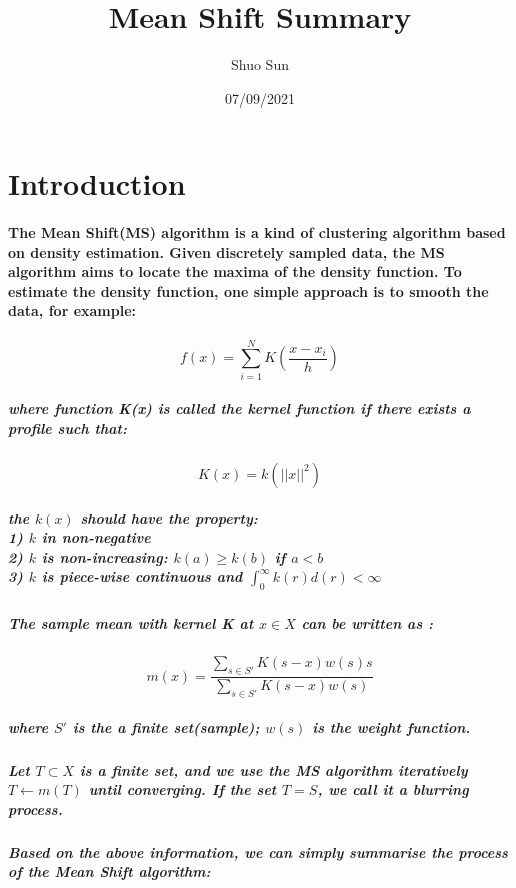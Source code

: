 \documentclass{article}
\title{Mean Shift Summary}
\author{Shuo Sun}
\date{07/09/2021}
\begin{document}
\maketitle

\section{Introduction}
\paragraph{
The Mean Shift(MS) algorithm is a kind of clustering algorithm based on density estimation. Given discretely sampled data, the MS algorithm aims to locate the maxima of the density function. To estimate the density function, one simple approach is to smooth the data, for example:
}
\begin{equation}
f(x) = \sum_{i=1}^{N}K(\frac{x-x_{i}}{h})
\end{equation}

\subparagraph{
where function K(x) is called the \textit{kernel function} if there exists a profile such that:
}
\begin{equation}
K(x) = k(||x||^2)
\end{equation}

\subparagraph{
the $k(x)$ should have the property:\\
1) $k$ in non-negative\\
2) $k$ is non-increasing: $k(a) \geq k(b)$ if $a < b$\\
3) $k$ is piece-wise continuous and $\int_{0}^{\infty}k(r)d(r) < \infty $
}

\subparagraph{
The sample mean with kernel K at $x \in X$ can be written as :
}

\begin{equation}
m(x) = \frac{\sum_{s\in S'}K(s-x)w(s)s}{\sum_{s \in S'}K(s-x)w(s)}
\end{equation}

\subparagraph{
where $S'$ is the a finite set(sample); $w(s)$ is the weight function.
}

\subparagraph{
Let $T \subset  X$ is a finite set, and we use the MS algorithm iteratively  $T \leftarrow m(T)$ until converging.  If the set $T = S$, we call it a blurring process.
}

\subparagraph{
    Based on the above information, we can simply summarise the process of the Mean Shift algorithm:
}
\clearpage
\end{document}

